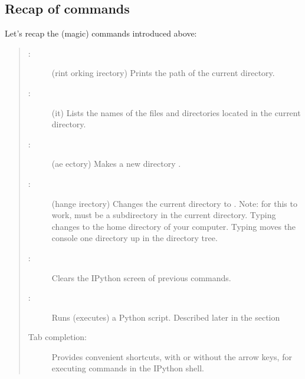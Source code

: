 \documentclass[letterpaper,10pt,english]{sphinxmanual}
\begin{document}
\subsection{Recap of commands}
\label{\detokenize{chap2/chap2_basics:recap-of-commands}}
\sphinxAtStartPar
Let’s recap the (magic) commands introduced above:
\begin{quote}
\begin{description}
\item[{:}] \leavevmode
\sphinxAtStartPar
(rint orking irectory) Prints the path of the current directory.

\item[{:}] \leavevmode
\sphinxAtStartPar
(it)  Lists the names of the files and directories located in the current directory.

\item[{ :}] \leavevmode
\sphinxAtStartPar
(ae ectory)  Makes a new directory .

\item[{ :}] \leavevmode
\sphinxAtStartPar
(hange irectory)  Changes the current directory to .  Note: for this to work,  must be a subdirectory in the current directory.  Typing  changes to the home directory of your computer.  Typing  moves the console one directory up in the directory tree.

\item[{:}] \leavevmode
\sphinxAtStartPar
Clears the IPython screen of previous commands.

\item[{ :}] \leavevmode
\sphinxAtStartPar
Runs (executes) a Python script.  Described later in the section {\hyperref[\detokenize{chap2/chap2_basics:chap2-scriptexmp1}]{}}

\item[{Tab completion:}] \leavevmode
\sphinxAtStartPar
Provides convenient shortcuts, with or without the arrow keys, for executing commands in the IPython shell.

\end{description}
\end{quote}
\end{document}
